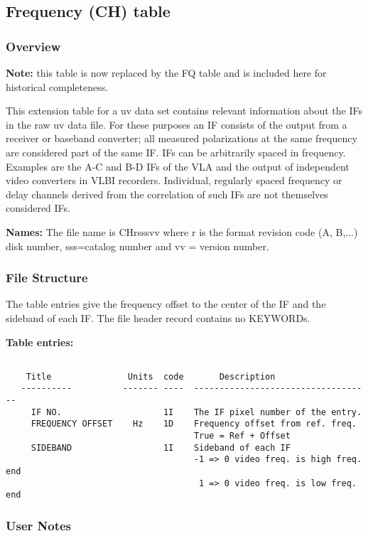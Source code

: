 \subsection{Frequency (CH) table}
\subsubsection{Overview}

   {\bf Note:} this table is now replaced by the FQ table and is included
here for historical completeness.

   This extension table for a uv data set contains relevant
information about the IFs in the raw uv data file.  For these purposes
an IF consists of the output from a receiver or baseband converter;
all measured polarizations at the same frequency are considered part
of the same IF.  IFs can be arbitrarily spaced in frequency.  Examples
are the A-C and B-D IFs of the VLA and the output of independent video
converters in VLBI recorders.  Individual, regularly spaced frequency
or delay channels derived from the correlation of such IFs are not
themselves considered IFs.


{\bf Names:} The file name is CHrsssvv where r is the format revision code
(A, B,...) disk number, sss=catalog number and vv = version number.

\subsubsection{File Structure}

     The table entries give the frequency offset to the center of
the IF and the sideband of each IF.  The file header record contains
no KEYWORDs.

{\bf Table entries:}

\begin{verbatim}

    Title               Units  code       Description
   ----------          ------- ----  -----------------------------------
     IF NO.                    1I    The IF pixel number of the entry.
     FREQUENCY OFFSET    Hz    1D    Frequency offset from ref. freq.
                                     True = Ref + Offset
     SIDEBAND                  1I    Sideband of each IF
                                     -1 => 0 video freq. is high freq. end
                                      1 => 0 video freq. is low freq. end

\end{verbatim}
\subsubsection{User Notes}

